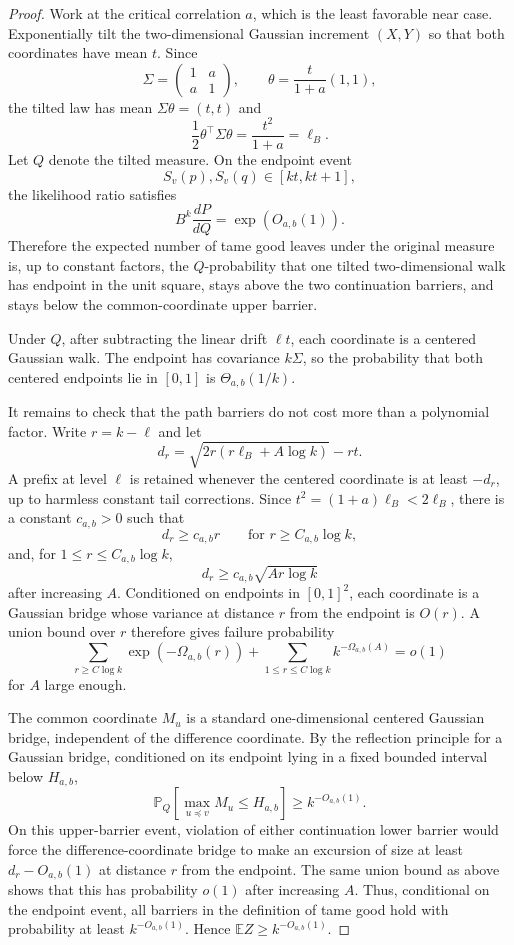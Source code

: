 \documentclass[10pt]{article}
\theoremstyle{definition}
\newcommand{\E}{\mathbb{E}}
\newcommand{\Prb}{\mathbb{P}}
\begin{document}
\begin{proof}
   Work at the critical correlation $a$, which is the least favorable near case. Exponentially tilt the two-dimensional Gaussian increment $(X,Y)$ so that both coordinates have mean $t$. Since
   \[
      \Sigma=
      \begin{pmatrix}
         1&a\\
         a&1
      \end{pmatrix},
      \qquad
      \theta=\frac{t}{1+a}(1,1),
   \]
   the tilted law has mean $\Sigma\theta=(t,t)$ and
   \[
      \frac12\theta^\top\Sigma\theta=\frac{t^2}{1+a}=\ell_B.
   \]
   Let $Q$ denote the tilted measure. On the endpoint event
   \[
      S_v(p),S_v(q)\in[kt,kt+1],
   \]
   the likelihood ratio satisfies
   \[
      B^k\frac{dP}{dQ}=\exp(O_{a,b}(1)).
   \]
   Therefore the expected number of tame good leaves under the original measure is, up to constant factors, the $Q$-probability that one tilted two-dimensional walk has endpoint in the unit square, stays above the two continuation barriers, and stays below the common-coordinate upper barrier.

   Under $Q$, after subtracting the linear drift $\ell t$, each coordinate is a centered Gaussian walk. The endpoint has covariance $k\Sigma$, so the probability that both centered endpoints lie in $[0,1]$ is $\Theta_{a,b}(1/k)$.

   It remains to check that the path barriers do not cost more than a polynomial factor. Write $r=k-\ell$ and let
   \[
      d_r=\sqrt{2r(r\ell_B+A\log k)}-rt.
   \]
   A prefix at level $\ell$ is retained whenever the centered coordinate is at least $-d_r$, up to harmless constant tail corrections. Since $t^2=(1+a)\ell_B<2\ell_B$, there is a constant $c_{a,b}>0$ such that
   \[
      d_r\ge c_{a,b}r
      \qquad\text{for } r\ge C_{a,b}\log k,
   \]
   and, for $1\le r\le C_{a,b}\log k$,
   \[
      d_r\ge c_{a,b}\sqrt{A r\log k}
   \]
   after increasing $A$. Conditioned on endpoints in $[0,1]^2$, each coordinate is a Gaussian bridge whose variance at distance $r$ from the endpoint is $O(r)$. A union bound over $r$ therefore gives failure probability
   \[
      \sum_{r\ge C\log k}\exp(-\Omega_{a,b}(r))
      +
      \sum_{1\le r\le C\log k} k^{-\Omega_{a,b}(A)}
      =
      o(1)
   \]
   for $A$ large enough.

   The common coordinate $M_u$ is a standard one-dimensional centered Gaussian bridge, independent of the difference coordinate. By the reflection principle for a Gaussian bridge, conditioned on its endpoint lying in a fixed bounded interval below $H_{a,b}$,
   \[
      \Prb_Q\!\left[\max_{u\preceq v}M_u\le H_{a,b}\right]
      \ge k^{-O_{a,b}(1)}.
   \]
   On this upper-barrier event, violation of either continuation lower barrier would force the difference-coordinate bridge to make an excursion of size at least $d_r-O_{a,b}(1)$ at distance $r$ from the endpoint. The same union bound as above shows that this has probability $o(1)$ after increasing $A$. Thus, conditional on the endpoint event, all barriers in the definition of tame good hold with probability at least $k^{-O_{a,b}(1)}$. Hence $\E Z\ge k^{-O_{a,b}(1)}$.
\end{proof}
\end{document}
